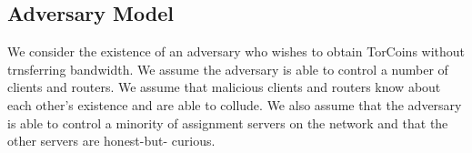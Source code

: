 \subsection{Adversary Model} We consider the existence of an adversary who
wishes to obtain TorCoins without trnsferring bandwidth. We assume the
adversary is able to control a number of clients and routers. We assume that
malicious clients and routers know about each other's existence and are able
to collude. We also assume that the adversary is able to control a minority of
assignment servers on the network and that the other servers are honest-but-
curious.





